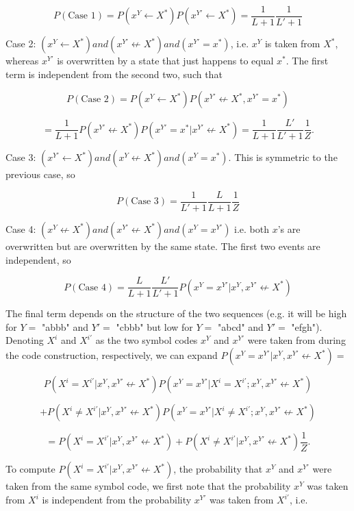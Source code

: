 \documentclass{article}
\begin{document}
$$P(\textrm{Case 1}) = P(x^Y \leftarrow X^*)P(x^{Y'} \leftarrow X^*) = \frac{1}{L+1}\frac{1}{L'+1}$$

Case 2: $(x^Y \leftarrow X^*) and (x^{Y'} \not \leftarrow X^*) and (x^{Y'} = x^*)$, i.e. $x^Y$ is taken from $X^*$, whereas $x^{Y'}$ is overwritten by a state that just happens to equal $x^*$. The first term is independent from the second two, such that

$$P(\textrm{Case 2}) = P(x^Y \leftarrow X^*)P(x^{Y'} \not \leftarrow X^*, x^{Y'} = x^*)$$

$$ = \frac{1}{L+1}P(x^{Y'} \not \leftarrow X^*)P(x^{Y'} = x^*|x^{Y'} \not \leftarrow X^*) = \frac{1}{L+1}\frac{L'}{L'+1}\frac{1}{Z}.$$

Case 3: $(x^{Y'} \leftarrow X^*) and (x^Y \not \leftarrow X^*) and (x^Y = x^*)$. This is symmetric to the previous case, so 

$$P(\textrm{Case 3}) = \frac{1}{L'+1}\frac{L}{L+1}\frac{1}{Z}$$

Case 4: $(x^Y \not \leftarrow X^*) and (x^{Y'} \not \leftarrow X^*) and (x^Y = x^{Y'})$ i.e. both $x$'s are overwritten but are overwritten by the same state. The first two events are independent, so

$$P(\textrm{Case 4}) = \frac{L}{L+1}\frac{L'}{L'+1}P(x^Y = x^{Y'} | x^Y, x^{Y'} \not \leftarrow X^*)$$

The final term depends on the structure of the two sequences (e.g. it will be high for $Y =$ "abbb" and $Y' =$ "cbbb" but low for $Y =$ "abcd" and $Y' =$ "efgh"). Denoting $X^i$ and $X^{i'}$ as the two symbol codes $x^Y$ and $x^{Y'}$ were taken from during the code construction, respectively, we can expand $P(x^Y = x^{Y'} | x^Y, x^{Y'} \not \leftarrow X^*) =$

$$P(X^i = X^{i'}| x^Y, x^{Y'} \not \leftarrow X^*)P(x^Y = x^{Y'}|X^i = X^{i'}; x^Y, x^{Y'} \not \leftarrow X^*)$$

$$+ P(X^i \neq X^{i'} | x^Y, x^{Y'} \not \leftarrow X^*)P(x^Y = x^{Y'}|X^i \neq X^{i'}; x^Y, x^{Y'} \not \leftarrow X^*)$$

$$ = P(X^i = X^{i'}| x^Y, x^{Y'} \not \leftarrow X^*) + P(X^i \neq X^{i'}| x^Y, x^{Y'} \not \leftarrow X^*)\frac{1}{Z}.$$

To compute $P(X^i = X^{i'}| x^Y, x^{Y'} \not \leftarrow X^*)$, the probability that $x^Y$ and $x^{Y'}$ were taken from the same symbol code, we first note that the probability $x^Y$ was taken from $X^i$ is independent from the probability $x^{Y'}$ was taken from $X^{i'}$, i.e.
\end{document}
